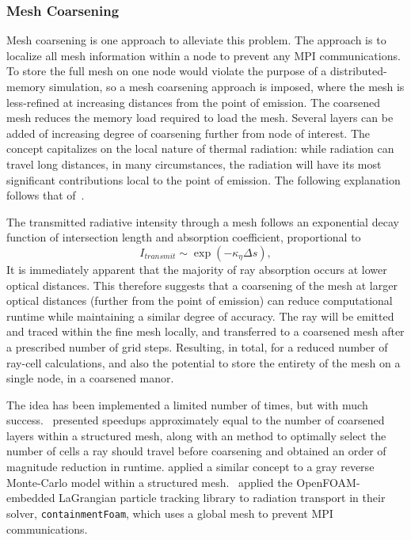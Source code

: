 \subsubsection{Mesh Coarsening}
Mesh coarsening is one approach to alleviate this problem. The approach is to localize all mesh information within a node to prevent any MPI communications.
To store the full mesh on one node would violate the purpose of a distributed-memory simulation, so a mesh coarsening approach is imposed, where the mesh is less-refined at increasing distances from the point of emission.
The coarsened mesh reduces the memory load required to load the mesh. Several layers can be added of increasing degree of coarsening further from node of interest. The concept capitalizes on the local nature of thermal radiation: 
while radiation can travel long distances, in many circumstances, the radiation will have its most significant contributions local to the point of emission.
The following explanation follows that of~\citet{Silvestri2019ASimulation}.

The transmitted radiative intensity through a mesh follows an exponential decay function of intersection length and absorption coefficient, proportional to
\begin{equation}
     I_{transmit} \sim \exp{\left(-\kappa{}_\eta{}\Delta{s}\right)},
    \label{eq:specular_reflection}
\end{equation}
It is immediately apparent that the majority of ray absorption occurs at lower optical distances. This therefore suggests that a coarsening of the mesh at larger optical distances (further from the point of emission) can reduce computational runtime while maintaining a similar degree of accuracy.
The ray will be emitted and traced within the fine mesh locally, and transferred to a coarsened mesh after a prescribed number of grid steps.
Resulting, in total, for a reduced number of ray-cell calculations, and also the potential to store the entirety of the mesh on a single node, in a coarsened manor. 

The idea has been implemented a limited number of times, but with much success.~\citet{Silvestri2019ASimulation} presented speedups approximately equal to the number of coarsened layers within a structured mesh, along with an method to optimally select the number of cells a ray should travel before coarsening and obtained an order of magnitude reduction in runtime. 
\citet{Humphrey2015ATracing} applied a similar concept to a gray reverse Monte-Carlo model within a structured mesh.~\citet{Kelm2021TheTransport} applied the OpenFOAM-embedded LaGrangian particle tracking library to radiation transport in their solver, \verb|containmentFoam|, which uses a global mesh to prevent MPI communications.

